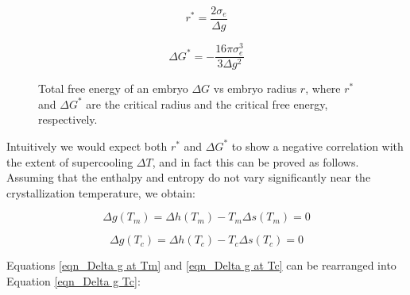 \begin{equation}
\label{eqn_critical radius of embryo}
r^{*} = \dfrac{2\sigma_{e}}{\Delta g}
\end{equation}

\begin{equation}
\label{eqn_critical energy of embryo}
\Delta G^{*} = -\dfrac{16\pi\sigma_{e}^{3}}{3\Delta g^{2}}
\end{equation}

\begin{figure}[H]
\center
{}
\caption{Total free energy of an embryo $\Delta G$ vs embryo radius $r$, where $r^{*}$ and $\Delta G^{*}$ are the critical radius and the critical free energy, respectively.}
\label{fig:Delta G embryo}
\end{figure}

Intuitively we would expect both $r^{*}$ and $\Delta G^{*}$ to show a negative correlation with the extent of supercooling $\Delta T$, and in fact this can be proved as follows. Assuming that the enthalpy and entropy do not vary significantly near the crystallization temperature, we obtain:

\begin{equation}
\label{eqn_Delta g at Tm}
\Delta g(T_{m}) = \Delta h(T_{m}) - T_{m}\Delta s(T_{m}) = 0
\end{equation}


\begin{equation}
\label{eqn_Delta g at Tc}
\Delta g(T_{c}) = \Delta h(T_{c}) - T_{c}\Delta s(T_{c}) = 0
\end{equation}

Equations \ref{eqn_Delta g at Tm} and \ref{eqn_Delta g at Tc} can be rearranged into Equation \ref{eqn_Delta g Tc}:

